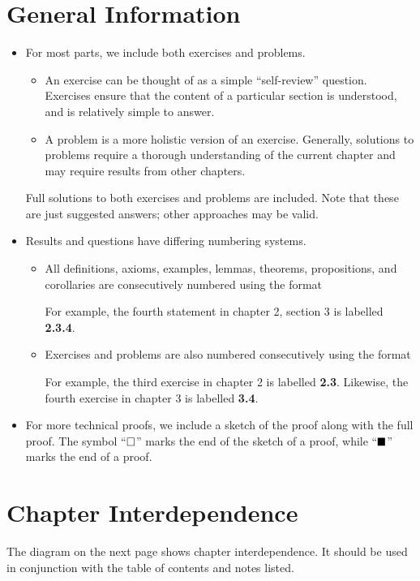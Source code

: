 \section*{General Information}
\begin{itemize}
    \item For most parts, we include both exercises and problems.
    \begin{itemize}
        \item An exercise can be thought of as a simple ``self-review'' question. Exercises ensure that the content of a particular section is understood, and is relatively simple to answer.
        \item A problem is a more holistic version of an exercise. Generally, solutions to problems require a thorough understanding of the current chapter and may require results from other chapters.
    \end{itemize}
    Full solutions to both exercises and problems are included. Note that these are just suggested answers; other approaches may be valid.

    \item Results and questions have differing numbering systems.
    \begin{itemize}
        \item All definitions, axioms, examples, lemmas, theorems, propositions, and corollaries are consecutively numbered using the format
        \begin{quote}
        \end{quote}
        For example, the fourth statement in chapter 2, section 3 is labelled \textbf{2.3.4}.
        \item Exercises and problems are also numbered consecutively using the format
        \begin{quote}
        \end{quote}
        For example, the third exercise in chapter 2 is labelled \textbf{2.3}. Likewise, the fourth exercise in chapter 3 is labelled \textbf{3.4}.
    \end{itemize}
    \item For more technical proofs, we include a sketch of the proof along with the full proof. The symbol ``$\square$'' marks the end of the sketch of a proof, while ``$\blacksquare$'' marks the end of a proof.
\end{itemize}

\section*{Chapter Interdependence}
The diagram on the next page shows chapter interdependence. It should be used in conjunction with the table of contents and notes listed.

